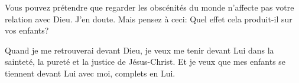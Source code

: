 Vous pouvez prétendre que regarder les obscénités du monde n'affecte pas
 votre relation avec Dieu. J'en doute. Mais pensez à ceci:
 Quel effet cela produit-il sur vos enfants? 

Quand je me retrouverai devant Dieu, je veux me tenir devant Lui
 dans la sainteté, la pureté et la justice de Jésus-Christ.
 Et je veux que mes enfants se tiennent devant Lui avec moi,
 complets en Lui. 

\dvrule



